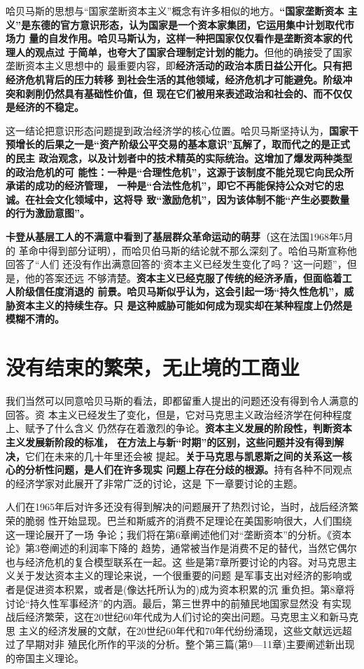 哈贝马斯的思想与“国家垄断资本主义”概念有许多相似的地方。\textbf{“国家垄断资本
  主义”是东德的官方意识形态，认为国家是一个资本家集团，它运用集中计划取代市场力
  量的自发作用。哈贝马斯认为，这样一种把国家仅仅看作是垄断资本家的代理人的观点过
  于简单，也夸大了国家合理制定计划的能力。}但他的确接受了国家垄断资本主义思想中的
最重要内容，即\textbf{经济活动的政治本质日益公开化。只有把经济危机背后的压力转移
  到社会生活的其他领域，经济危机才可能避免。阶级冲突和剥削仍然具有基础性价值，但
  现在它们被用来表述政治和社会的、而不仅仅是经济的不稳定。}

这一结论把意识形态问题提到政治经济学的核心位置。哈贝马斯坚持认为，\textbf{国家干
  预增长的后果之一是“资产阶级公平交易的基本意识”瓦解了，取而代之的是正式的民主
  政治观念，以及计划者中的技术精英的实际统治。这增加了爆发两种类型的政治危机的可
  能性：一种是“合理性危机”，这源于该制度不能兑现它向民众所承诺的成功的经济管理，
  一种是“合法性危机”，即它不再能保持公众对它的忠诚。在社会文化领域中，这将导
  致“激励危机”，因为该体制不能“产生必要数量的行为激励意图”。}

\textbf{卡登从基层工人的不满意中看到了基层群众革命运动的萌芽}（这在法国1968年5月的
革命中得到部分证明），而哈贝伯马斯的结论就不那么深刻了。哈伯马斯宣称他回答了“人们
还没有作出满意回答的‘资本主义已经发生变化了吗？’这一问题”，但是，他的答案还远
不够清楚。\textbf{资本主义已经克服了传统的经济矛盾，但面临着工人阶级信任度消退的
  前景。哈贝马斯似乎认为，这会引起一场“持久性危机”，威胁资本主义的持续生存。只
  是这种威胁可能如何成为现实却在某种程度上仍然是模糊不清的。}

\section{没有结束的繁荣，无止境的工商业}
我们当然可以同意哈贝马斯的看法，即都留重人提出的问题还没有得到令人满意的回答。资
本主义已经发生了变化，但是，它对马克思主义政治经济学在何种程度上、赋予了什么含义
仍然存在着激烈的争论。\textbf{资本主义发展的阶段性，判断资本主义发展新阶段的标准，
  在方法上与新“时期”的区别，这些问题并没有得到解决，}它们在未来的几十年里还会被
提起。\textbf{关于马克思与凯恩斯之间的关系这一核心的分析性问题，是人们在许多现实
  问题上存在分歧的根源。}持有各种不同观点的经济学家对此展开了非常广泛的讨论，这是
下一章要讨论的主题。

人们在1965年后对许多还没有得到解决的问题展开了热烈讨论，当时，战后经济繁荣的脆弱
性开始显现。巴兰和斯威齐的消费不足理论在美国影响很大，人们围绕这一理论展开了一场
争论；我们将在第6章阐述他们对“垄断资本”的分析。《资本论》第3卷阐述的利润率下降的
趋势，通常被当作是消费不足的替代，当然它偶尔也与经济危机的复合模型联系在一起。这
些是第7章所要讨论的内容。对马克思主义关于发达资本主义的理论来说，一个很重要的问题
是军事支出对经济的影响或者是促进资本积累，或者是(像达托所认为的)成为资本积累的沉
重负担。第8章将讨论“持久性军事经济”的内涵。最后，第三世界中的前殖民地国家显然没
有实现战后经济繁荣，这在20世纪60年代成为人们讨论的突出问题。马克思主义和新马克思
主义的经济发展的文献，在20世纪60年代和70年代纷纷涌现，这些文献远远超过了早期对非
殖民化所作的平淡的分析。整个第三篇(第9—11章)主要阐述新出现的帝国主义理论。

